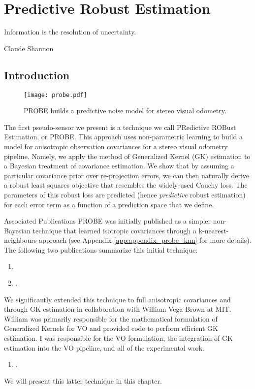 \chapter{Predictive Robust Estimation}
\label{ch:probe}
\epigraph{Information is the resolution of uncertainty.}{Claude Shannon}

\section{Introduction}

\begin{figure*}[h!]
\centering
\texttt{[image: probe.pdf]}
 \caption{PROBE builds a predictive noise model for stereo visual odometry.}
 \label{fig:probe_intro_fig}
\end{figure*}

The first pseudo-sensor we present is a technique we call PRedictive ROBust Estimation, or PROBE. This approach uses non-parametric learning to build a model for anisotropic observation covariances for a stereo visual odometry pipeline. Namely, we apply the method of Generalized Kernel (GK) estimation to a Bayesian treatment of covariance estimation. We show that by assuming a particular covariance prior over re-projection errors, we can then naturally derive a robust least squares objective that resembles the widely-used Cauchy loss. The parameters of this robust loss are predicted (hence \textit{predictive} robust estimation) for each error term as a function of a prediction space that we define.

\begin{remark}{Associated Publications}
PROBE was initially published as a simpler non-Bayesian technique that learned isotropic covariances through a k-nearest-neighbours approach (see Appendix \ref{app:appendix_probe_knn} for more details).  The following two publications summarize this initial technique:
\begin{enumerate}
\item {}
\item {}.
\end{enumerate}

We significantly extended this technique to full anisotropic covariances and through GK estimation in collaboration with William Vega-Brown at MIT. William was primarily responsible for the mathematical formulation of Generalized Kernels for VO and provided code to perform efficient GK estimation. I was responsible for the VO formulation, the integration of GK estimation into the VO pipeline, and all of the experimental work.
\begin{enumerate}[resume]
\item {}	.
\end{enumerate}
We will present this latter technique in this chapter.
\end{remark}

